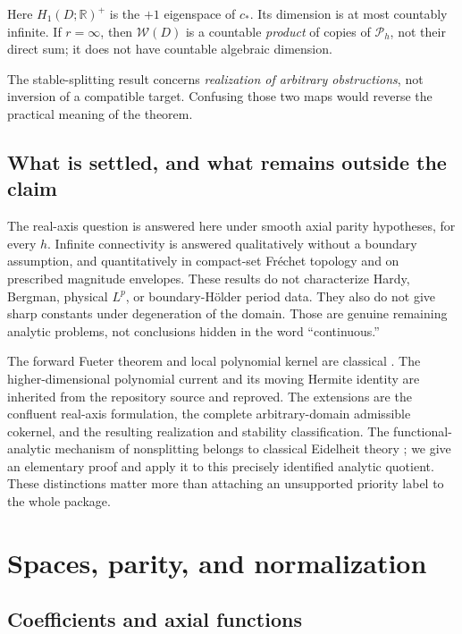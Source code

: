 \documentclass[11pt,a4paper]{article}
\numberwithin{equation}{section}
\theoremstyle{definition}
\theoremstyle{remark}
\newcommand{\R}{\mathbb R}
\newcommand{\Pspace}{\mathscr P_h}
\newcommand{\calW}{\mathscr W}
\begin{document}
Here $H_1(D;\R)^+$ is the $+1$ eigenspace of $c_*$. Its dimension is at most
countably infinite. If $r=\infty$, then $\calW(D)$ is a countable
\emph{product} of copies of $\Pspace$, not their direct sum; it does not have
countable algebraic dimension.

The stable-splitting result concerns \emph{realization of arbitrary
obstructions}, not inversion of a compatible target. Confusing those two maps
would reverse the practical meaning of the theorem.

\subsection{What is settled, and what remains outside the claim}

The real-axis question is answered here under smooth axial parity hypotheses,
for every $h$. Infinite connectivity is answered qualitatively without a
boundary assumption, and quantitatively in compact-set Fr\'echet topology
and on prescribed magnitude envelopes. These results do not characterize
Hardy, Bergman, physical $L^p$, or boundary-H\"older period data. They also do
not give sharp constants under degeneration of the domain. Those are genuine
remaining analytic problems, not conclusions hidden in the word
``continuous.''

The forward Fueter theorem and local polynomial kernel are classical
\cite{colombo2011,colombo2014}. The higher-dimensional polynomial current and
its moving Hermite identity are inherited from the repository source and
reproved. The extensions are the confluent real-axis formulation, the complete
arbitrary-domain admissible cokernel, and the resulting realization and
stability classification. The functional-analytic mechanism of nonsplitting
belongs to classical Eidelheit theory \cite{vogt,debrouwere}; we give an
elementary proof and apply it to this precisely identified analytic quotient.
These distinctions matter more than attaching an unsupported priority label
to the whole package.

\section{Spaces, parity, and normalization}
\label{sec:spaces}

\subsection{Coefficients and axial functions}
\end{document}
